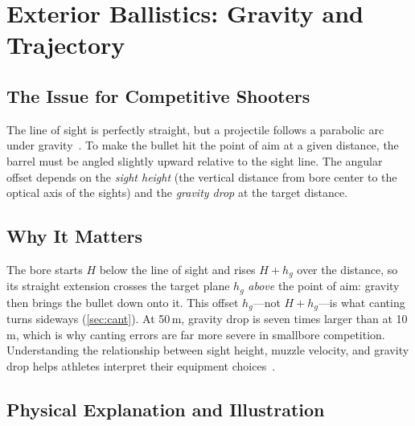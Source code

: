 \documentclass[11pt]{article}
\begin{document}
\section{Exterior Ballistics: Gravity and Trajectory}\label{sec:ballistics}

\subsection{The Issue for Competitive Shooters}
The line of sight is perfectly straight, but a projectile follows a
parabolic arc under gravity~\cite{mccoy,rinker}.  To make the
bullet hit the point of aim at a given distance, the barrel must be
angled slightly upward relative to the sight line.  The angular
offset depends on the \emph{sight height} (the vertical distance
from bore center to the optical axis of the sights) and the
\emph{gravity drop} at the target distance.

\subsection{Why It Matters}
The bore starts $H$ below the line of sight and rises $H + h_g$ over
the distance, so its straight extension crosses the target plane
$h_g$ \emph{above} the point of aim: gravity then brings the bullet
down onto it.  This offset $h_g$---not $H + h_g$---is what canting
turns sideways (\cref{sec:cant}).  At 50\,m, gravity drop is seven
times larger than at 10\,m, which is why canting errors are far more
severe in smallbore competition.  Understanding the relationship between sight height,
muzzle velocity, and gravity drop helps athletes interpret their
equipment choices~\cite{litz,pejsa}.

\subsection{Physical Explanation and Illustration}
\end{document}
